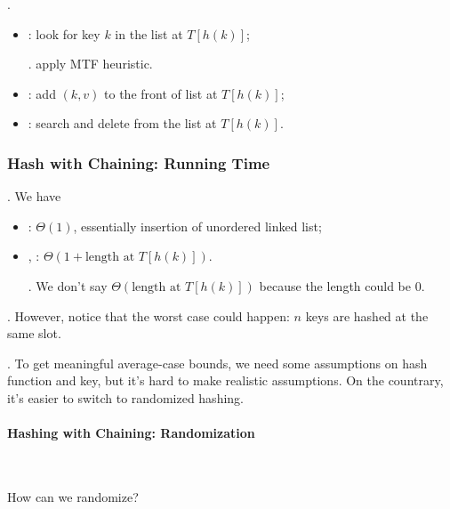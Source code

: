 \documentclass{article}
\begin{document}
\begin{codes}[Operations].
    \begin{itemize}
        \item {}: look for key $k$ in the list at $T[h(k)]$; 
        \begin{comm}[].
            apply MTF heuristic. 
        \end{comm}
        \item {}: add $(k, v)$ to the front of list at $T[h(k)]$; 
        \item {}: search and delete from the list at $T[h(k)]$. 
    \end{itemize}
\end{codes}

\subsubsection{Hash with Chaining: Running Time} 

\begin{discovery}[].
    We have \begin{itemize}
        \item {}: $\Theta(1)$, essentially insertion of unordered linked list; 
        \item {}, : $\Theta(1 + \text{length at } T[h(k)])$. \begin{comm}[].
            We don't say $\Theta(\text{length at } T[h(k)])$ because the length could be 0. 
        \end{comm}
    \end{itemize}
\end{discovery}

\begin{result}[].
    However, notice that the worst case could happen: $n$ keys are hashed at the same slot. 
\end{result}

\begin{comm}[].
    To get meaningful average-case bounds, we need some assumptions on hash function and key, but it's hard to make realistic assumptions. On the countrary, it's easier to switch to randomized hashing. 
\end{comm}

\paragraph{Hashing with Chaining: Randomization} 
\phantom{text} \\
\vspace{-0.25cm} 
\begin{Question}{}
    How can we randomize? 
\end{Question}
\end{document}
